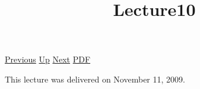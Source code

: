 \documentclass[12pt,a4paper]{report}
\begin{document}
 \href{doc/phil/People/Brandom/OnSellars/2009/Lecture09.html}{Previous} 
 \href{doc/phil/People/Brandom/OnSellars/2009.html}{Up} 
 \href{doc/phil/People/Brandom/OnSellars/2009/Lecture11.html}{Next} 
 \href{doc/phil/People/Brandom/OnSellars/2009/Lecture10.pdf}{PDF} 
\title{Lecture10}

\tableofcontents
This lecture was delivered on November 11, 2009.
\end{document}
